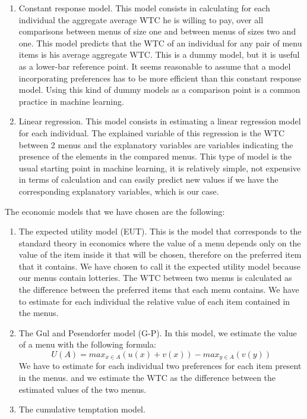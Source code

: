 \documentclass[
]{book}
\begin{document}
\begin{enumerate}
\def\labelenumi{\arabic{enumi}.}
\item
  Constant response model.
  This model consists in calculating for each individual the aggregate average WTC he is
  willing to pay, over all comparisons between menus of size one and between menus
  of sizes two and one.
  This model predicts that the WTC of an individual for any pair of menu items is
  his average aggregate WTC.
  This is a dummy model, but it is useful as a lower-bar reference point.
  It seems reasonable to assume that a model incorporating preferences has to be
  more efficient than this constant response model.
  Using this kind of dummy models as a comparison point is a common practice in
  machine learning.
\item
  Linear regression.
  This model consists in estimating a linear regression model for each individual.
  The explained variable of this regression is the WTC between 2 menus and the
  explanatory variables are variables indicating the presence of the elements in
  the compared menus.
  This type of model is the usual starting point in machine learning, it is
  relatively simple, not expensive in terms of calculation and can easily predict
  new values if we have the corresponding explanatory variables, which is our
  case.
\end{enumerate}

The economic models that we have chosen are the following:

\begin{enumerate}
\def\labelenumi{\arabic{enumi}.}
\item
  The expected utility model (EUT).
  This is the model that corresponds to the standard theory in economics where
  the value of a menu depends only on the value of the item inside it that will be
  chosen, therefore on the preferred item that it contains.
  We have chosen to call it the expected utility model because our menus contain
  lotteries.
  The WTC between two menus is calculated as the difference between the preferred
  items that each menu contains.
  We have to estimate for each individual the relative value of each item
  contained in the menus.
\item
  The Gul and Pesendorfer model (G-P).
  In this model, we estimate the value of a menu with the following formula:
  \[ U(A) = max_{x \in A}(u(x) + v(x)) - max_{y \in A}(v(y)) \]
  We have to estimate for each individual two preferences for each item present in
  the menus.
  and we estimate the WTC as the difference between the estimated values of the two
  menus.
\item
  The cumulative temptation model.
\end{enumerate}
\end{document}
